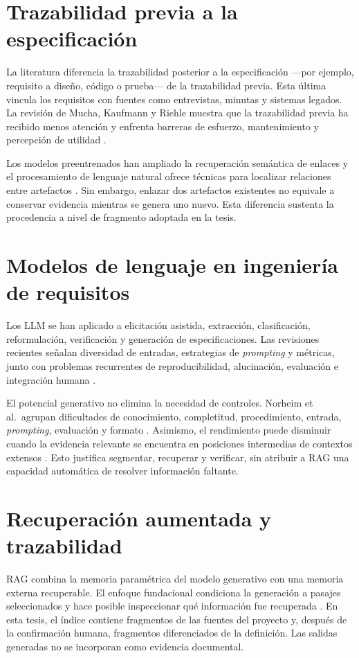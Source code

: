 \section{Trazabilidad previa a la especificación}

La literatura diferencia la trazabilidad posterior a la especificación ---por ejemplo, requisito a diseño, código o prueba--- de la trazabilidad previa. Esta última vincula los requisitos con fuentes como entrevistas, minutas y sistemas legados. La revisión de Mucha, Kaufmann y Riehle muestra que la trazabilidad previa ha recibido menos atención y enfrenta barreras de esfuerzo, mantenimiento y percepción de utilidad \cite{mucha2024}.

Los modelos preentrenados han ampliado la recuperación semántica de enlaces y el procesamiento de lenguaje natural ofrece técnicas para localizar relaciones entre artefactos \cite{guo2025}. Sin embargo, enlazar dos artefactos existentes no equivale a conservar evidencia mientras se genera uno nuevo. Esta diferencia sustenta la procedencia a nivel de fragmento adoptada en la tesis.

\section{Modelos de lenguaje en ingeniería de requisitos}

Los LLM se han aplicado a elicitación asistida, extracción, clasificación, reformulación, verificación y generación de especificaciones. Las revisiones recientes señalan diversidad de entradas, estrategias de \emph{prompting} y métricas, junto con problemas recurrentes de reproducibilidad, alucinación, evaluación e integración humana \cite{hemmat2025,cheng2026}.

El potencial generativo no elimina la necesidad de controles. Norheim et al.\ agrupan dificultades de conocimiento, completitud, procedimiento, entrada, \emph{prompting}, evaluación y formato \cite{norheim2024}. Asimismo, el rendimiento puede disminuir cuando la evidencia relevante se encuentra en posiciones intermedias de contextos extensos \cite{liu2024}. Esto justifica segmentar, recuperar y verificar, sin atribuir a RAG una capacidad automática de resolver información faltante.

\section{Recuperación aumentada y trazabilidad}

RAG combina la memoria paramétrica del modelo generativo con una memoria externa recuperable. El enfoque fundacional condiciona la generación a pasajes seleccionados y hace posible inspeccionar qué información fue recuperada \cite{lewis2020}. En esta tesis, el índice contiene fragmentos de las fuentes del proyecto y, después de la confirmación humana, fragmentos diferenciados de la definición. Las salidas generadas no se incorporan como evidencia documental.

